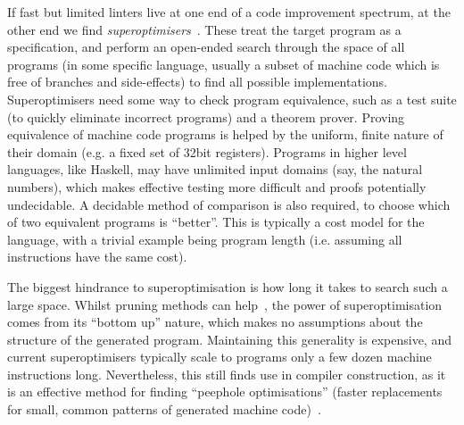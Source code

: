 If fast but limited linters live at one end of a code improvement spectrum, at
the other end we find \emph{superoptimisers}~\cite{massalin1987superoptimizer}.
These treat the target program as a specification, and perform an open-ended
search through the space of all programs (in some specific language, usually a
subset of machine code which is free of branches and side-effects) to find all
possible implementations. Superoptimisers need some way to check program
equivalence, such as a test suite (to quickly eliminate incorrect programs) and
a theorem prover. Proving equivalence of machine code programs is helped by the
uniform, finite nature of their domain (e.g. a fixed set of 32bit registers).
Programs in higher level languages, like Haskell, may have unlimited input
domains (say, the natural numbers), which makes effective testing more difficult
and proofs potentially undecidable. A decidable method of comparison is also
required, to choose which of two equivalent programs is ``better''. This is
typically a cost model for the language, with a trivial example being program
length (i.e. assuming all instructions have the same cost).

The biggest hindrance to superoptimisation is how long it takes to search such a
large space. Whilst pruning methods can help~\cite{phothilimthana2016scaling},
the power of superoptimisation comes from its ``bottom up'' nature, which makes
no assumptions about the structure of the generated program. Maintaining this
generality is expensive, and current superoptimisers typically scale to programs
only a few dozen machine instructions long. Nevertheless, this still finds use
in compiler construction, as it is an effective method for finding ``peephole
optimisations'' (faster replacements for small, common patterns of generated
machine code)~\cite{Bansal.Aiken:2006}.
